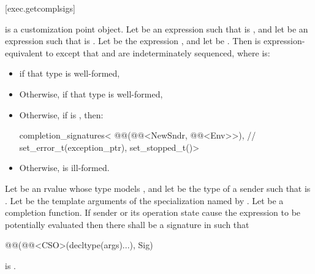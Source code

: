 [exec.getcomplsigs]{}

\pnum
{} is a customization point object.
Let  be an expression
such that  is , and
let  be an expression
such that  is .
Let  be the expression
, and
let  be .
Then  is expression-equivalent to
except that  and  are
indeterminately sequenced,
where  is:
\begin{itemize}
\item
{}
if that type is well-formed,

\item
Otherwise, 
if that type is well-formed,

\item
Otherwise,
if  is ,
then:
\begin{codeblock}
completion_signatures<
  @@(@@<NewSndr, @@<Env>>),        // 
  set_error_t(exception_ptr),
  set_stopped_t()>
\end{codeblock}

\item
Otherwise,  is ill-formed.
\end{itemize}

\pnum
Let  be an rvalue
whose type  models , and
let  be the type of a sender
such that  is .
Let  be the template arguments of
the  specialization
named by .
Let  be a completion function.
If sender  or its operation state cause
the expression 
to be potentially evaluated
then there shall be a signature  in 
such that
\begin{codeblock}
@@(@@<CSO>(decltype(args)...), Sig)
\end{codeblock}
is .


